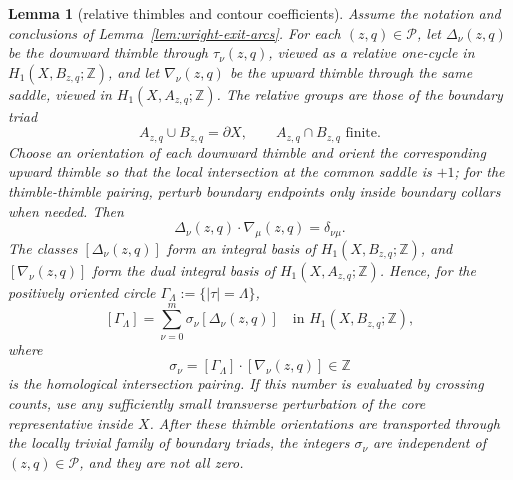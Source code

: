 \documentclass[10pt,a4paper]{amsart}
\newtheorem{lem}{Lemma}
\begin{document}
\begin{lem}[relative thimbles and contour coefficients]\label{lem:wright-thimble-basis}
Assume the notation and conclusions of Lemma~\ref{lem:wright-exit-arcs}. For each $(z,q)\in\mathcal P$, let $\Delta_\nu(z,q)$ be the downward thimble through $\tau_\nu(z,q)$, viewed as a relative one-cycle in $H_1(X,B_{z,q};\mathbb Z)$, and let $\nabla_\nu(z,q)$ be the upward thimble through the same saddle, viewed in $H_1(X,A_{z,q};\mathbb Z)$. The relative groups are those of the boundary triad
$$A_{z,q}\cup B_{z,q}=\partial X,\qquad A_{z,q}\cap B_{z,q}\text{ finite}.$$
Choose an orientation of each downward thimble and orient the corresponding upward thimble so that the local intersection at the common saddle is $+1$; for the thimble-thimble pairing, perturb boundary endpoints only inside boundary collars when needed. Then
$$\Delta_\nu(z,q)\cdot\nabla_\mu(z,q)=\delta_{\nu\mu}.$$
The classes $[\Delta_\nu(z,q)]$ form an integral basis of $H_1(X,B_{z,q};\mathbb Z)$, and $[\nabla_\nu(z,q)]$ form the dual integral basis of $H_1(X,A_{z,q};\mathbb Z)$. Hence, for the positively oriented circle $\Gamma_\Lambda:=\{|\tau|=\Lambda\}$,
$$[\Gamma_\Lambda]=\sum_{\nu=0}^m\sigma_\nu[\Delta_\nu(z,q)]
\quad\text{in }H_1(X,B_{z,q};\mathbb Z),$$
where
$$\sigma_\nu=[\Gamma_\Lambda]\cdot[\nabla_\nu(z,q)]\in\mathbb Z$$
is the homological intersection pairing. If this number is evaluated by crossing counts, use any sufficiently small transverse perturbation of the core representative inside $X$.
After these thimble orientations are transported through the locally trivial family of boundary triads, the integers $\sigma_\nu$ are independent of $(z,q)\in\mathcal P$, and they are not all zero.
\end{lem}
\end{document}
